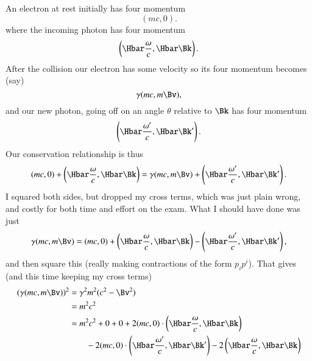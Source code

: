 {An electron at rest initially has four momentum
%
\begin{equation}\label{eqn:relativisticElectrodynamicsExamReflection:310}
(m c, 0).
\end{equation}
%
where the incoming photon has four momentum
%
\begin{equation}\label{eqn:relativisticElectrodynamicsExamReflection:330}
\left(\Hbar \frac{\omega}{c}, \Hbar \Bk \right).
\end{equation}
%
After the collision our electron has some velocity so its four momentum becomes (say)
%
\begin{equation}\label{eqn:relativisticElectrodynamicsExamReflection:350}
\gamma (m c, m \Bv),
\end{equation}
and our new photon, going off on an angle \(\theta\) relative to \(\Bk\) has four momentum
%
\begin{equation}\label{eqn:relativisticElectrodynamicsExamReflection:370}
\left(\Hbar \frac{\omega'}{c}, \Hbar \Bk' \right).
\end{equation}
Our conservation relationship is thus
\begin{equation}\label{eqn:relativisticElectrodynamicsExamReflection:390}
(m c, 0) + \left(\Hbar \frac{\omega}{c}, \Hbar \Bk \right)
=
\gamma (m c, m \Bv)
+
\left(\Hbar \frac{\omega'}{c}, \Hbar \Bk' \right).
\end{equation}
%
I squared both sides, but dropped my cross terms, which was just plain wrong, and costly for both time and effort on the exam.  What I should have done was just
%
\begin{equation}\label{eqn:relativisticElectrodynamicsExamReflection:410}
\gamma (m c, m \Bv) =
(m c, 0) + \left(\Hbar \frac{\omega}{c}, \Hbar \Bk \right)
-\left(\Hbar \frac{\omega'}{c}, \Hbar \Bk' \right),
\end{equation}
%
and then square this (really making contractions of the form \(p_i p^i\)).  That gives (and this time keeping my cross terms)
%
\begin{equation}\label{eqn:relativisticElectrodynamicsExamReflection:1350}
\begin{aligned}
(\gamma (m c, m \Bv) )^2
&= \gamma^2 m^2 (c^2 - \Bv^2) \\
&= m^2 c^2 \\
&=
m^2 c^2 + 0 + 0
+ 2 (m c, 0)
\cdot \left(\Hbar \frac{\omega}{c}, \Hbar \Bk \right) \\
&\qquad - 2 (m c, 0) \cdot \left(\Hbar \frac{\omega'}{c}, \Hbar \Bk' \right)
- 2
\left(\Hbar \frac{\omega}{c}, \Hbar \Bk \right)

\end{aligned}
\end{equation}}
